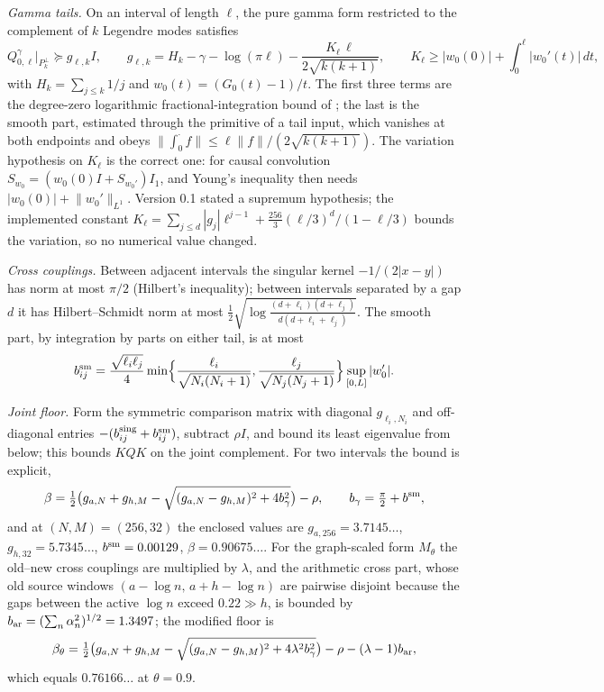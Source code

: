 \documentclass[11pt]{article}
\numberwithin{equation}{section}
\theoremstyle{definition}
\theoremstyle{remark}
\newcommand{\norm}[1]{\lVert#1\rVert}
\begin{document}
\emph{Gamma tails.} On an interval of length $\ell$, the pure gamma form restricted to the complement of $k$ Legendre modes satisfies
\begin{equation}\label{eq:gtail}
 Q^\gamma_{0,\ell}\big|_{P_k^\perp}\succeq g_{\ell,k}I,\qquad
 g_{\ell,k}=H_k-\gamma-\log(\pi\ell)-\frac{K_\ell\,\ell}{2\sqrt{k(k+1)}},\qquad
 K_\ell\ge|w_0(0)|+\int_0^\ell|w_0'(t)|\,dt,
\end{equation}
with $H_k=\sum_{j\le k}1/j$ and $w_0(t)=(G_0(t)-1)/t$. The first three terms are the degree-zero logarithmic fractional-integration bound of \cite{WeilDepth}; the last is the smooth part, estimated through the primitive of a tail input, which vanishes at both endpoints and obeys $\norm{\int_0^\cdot f}\le\ell\norm f/(2\sqrt{k(k+1)})$. The variation hypothesis on $K_\ell$ is the correct one: for causal convolution $S_{w_0}=(w_0(0)I+S_{w_0'})I_1$, and Young's inequality then needs $|w_0(0)|+\norm{w_0'}_{L^1}$. Version 0.1 stated a supremum hypothesis; the implemented constant $K_\ell=\sum_{j\le d}|g_j|\ell^{j-1}+\tfrac{256}3(\ell/3)^d/(1-\ell/3)$ bounds the variation, so no numerical value changed.

\emph{Cross couplings.} Between adjacent intervals the singular kernel $-1/(2|x-y|)$ has norm at most $\pi/2$ (Hilbert's inequality); between intervals separated by a gap $d$ it has Hilbert--Schmidt norm at most $\tfrac12\sqrt{\log\frac{(d+\ell_i)(d+\ell_j)}{d(d+\ell_i+\ell_j)}}$. The smooth part, by integration by parts on either tail, is at most
\[
 b^{\rm sm}_{ij}=\frac{\sqrt{\ell_i\ell_j}}4\min\Bigl\{\frac{\ell_i}{\sqrt{N_i(N_i+1)}},\frac{\ell_j}{\sqrt{N_j(N_j+1)}}\Bigr\}\sup_{[0,L]}|w_0'| .
\]

\emph{Joint floor.} Form the symmetric comparison matrix with diagonal $g_{\ell_i,N_i}$ and off-diagonal entries $-(b^{\rm sing}_{ij}+b^{\rm sm}_{ij})$, subtract $\rho I$, and bound its least eigenvalue from below; this bounds $KQK$ on the joint complement. For two intervals the bound is explicit,
\begin{equation}\label{eq:beta}
 \beta=\tfrac12\bigl(g_{a,N}+g_{h,M}-\sqrt{(g_{a,N}-g_{h,M})^2+4b_\gamma^2}\bigr)-\rho,\qquad b_\gamma=\tfrac\pi2+b^{\rm sm},
\end{equation}
and at $(N,M)=(256,32)$ the enclosed values are $g_{a,256}=3.7145\ldots$, $g_{h,32}=5.7345\ldots$, $b^{\rm sm}=0.00129$, $\beta=0.90675\ldots$. For the graph-scaled form $M_\theta$ the old--new cross couplings are multiplied by $\lambda$, and the arithmetic cross part, whose old source windows $(a-\log n,\,a+h-\log n)$ are pairwise disjoint because the gaps between the active $\log n$ exceed $0.22\gg h$, is bounded by $b_{\rm ar}=(\sum_n\alpha_n^2)^{1/2}=1.3497$; the modified floor is
\begin{equation}\label{eq:betatheta}
 \beta_\theta=\tfrac12\bigl(g_{a,N}+g_{h,M}-\sqrt{(g_{a,N}-g_{h,M})^2+4\lambda^2b_\gamma^2}\bigr)-\rho-(\lambda-1)b_{\rm ar},
\end{equation}
which equals $0.76166\ldots$ at $\theta=0.9$.
\end{document}
